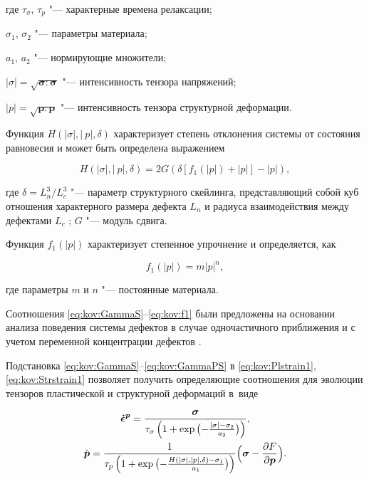 где $\tau_{\sigma}$, $\tau_{p}$ "--- характерные времена релаксации; 

$\sigma_{1}$, $\sigma_{2}$ "---  параметры материала; 

$a_{1}$, $a_{2}$ "---  нормирующие множители;

$ | \sigma | =\sqrt{\boldsymbol{\sigma}:\boldsymbol{\sigma}}$ "--- интенсивность тензора напряжений;

$ |  p  | =\sqrt{\boldsymbol{p}:\boldsymbol{p}}$ "--- интенсивность тензора структурной деформации.





Функция $H( | \sigma | ,  | \ p | , \delta)$ характеризует степень отклонения системы от состояния равновесия  и может быть определена выражением

\begin{equation}

H( | \sigma | , | \ p | ,\delta)=2G(\delta[f_{1}( |  p  | )+ |  p  | ]- |  p  | ), \label{eq:kov:H}

\end{equation}

где $\delta=L^{3}_{n}/L^{3}_{c}$ "---  параметр структурного скейлинга, представляющий собой куб отношения характерного размера дефекта $L_{n}$ и радиуса взаимодействия между дефектами $L_{c}$ \cite{kostina:bib:NaimarkP}; $G$ "--- модуль сдвига.

Функция $f_{1}( |  p  | )$ характеризует степенное упрочнение и определяется, как

\begin{equation}

f_{1}( |  p  | )=m |  p  | ^n, \label{eq:kov:f1}

\end{equation}

где параметры $m$ и $n$ "--- постоянные материала.



Соотношения \eqref{eq:kov:GammaS}--\eqref{eq:kov:f1} были предложены на основании анализа поведения системы дефектов в случае одночастичного приближения  \cite{kostina:bib:NaimarkP} и с учетом переменной концентрации дефектов \cite{kostina:bib:Plekhov}.  

Подстановка \eqref{eq:kov:GammaS}--\eqref{eq:kov:GammaPS} в \eqref{eq:kov:Plstrain1}, \eqref{eq:kov:Strstrain1} позволяет получить определяющие соотношения для эволюции тензоров пластической и структурной деформаций в~виде

\begin{gather}

\boldsymbol{\dot{\epsilon}^{p}}= \frac{\boldsymbol{\sigma}}{\tau_{\sigma}\left(1+\exp{\bigl(-\frac{ | \sigma | -\sigma_{2}}{a_{2}}\bigr)}\right)}, \label{eq:kov:Plstrain2}\\

\dot{\boldsymbol{p}}=\frac{1}{\tau_{p}\left(1+\exp{\bigl(-\frac{H( | \sigma | , |  p  | ,\delta)-\sigma_{1}}{a_{1}}\bigr)}\right)} \Bigl(\boldsymbol{\sigma}-\frac{\partial F}{\partial{\boldsymbol{p}}}\Bigr). \label{eq:kov:Strstrain2}

\end{gather}

